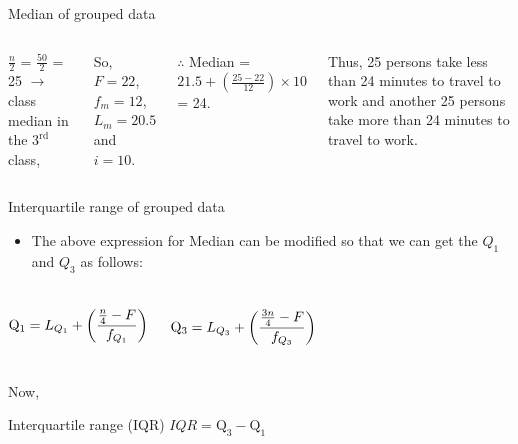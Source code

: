 \documentclass[
  ignorenonframetext,
  aspectratio=169]{beamer}
\providecommand{\tightlist}{%
  \setlength{\itemsep}{0pt}\setlength{\parskip}{0pt}}
\begin{document}
\begin{frame}{Median of grouped data}
\begin{columns}[T, onlytextwidth]
\footnotesize
$\frac{n}{2}$ = $\frac{50}{2}$ = 25 $\longrightarrow$ class median in the $3^{\text{rd}}$ class,

So, $F = 22$, $f_m = 12$, $L_m = 20.5$ and $i = 10$.

$\therefore$ Median = $21.5 + \left(\frac{25-22}{12}\right)\times 10$ = 24.

Thus, 25 persons take less than 24 minutes to travel to work and another 25 persons take more than 24 minutes to travel to work.

\end{columns}
\end{frame}

\begin{frame}{Interquartile range of grouped data}
\protect\hypertarget{interquartile-range-of-grouped-data}{}
\begin{itemize}
\tightlist
\item
  The above expression for Median can be modified so that we can get the
  \(Q_1\) and \(Q_3\) as follows:
\end{itemize}

\begin{columns}[T,onlytextwidth]

$$
\small
\mathrm{Q_1} = L_{Q_1} + \left(  \frac{\frac{n}{4} - F}{f_{Q_1}} \right)
$$

$$
\small
\mathrm{Q_3} = L_{Q_3} + \left(  \frac{\frac{3n}{4} - F}{f_{Q_3}} \right)
$$

\end{columns}

Now,

\begin{block}{Interquartile range (IQR)}
$IQR = \mathrm{Q_3} - \mathrm{Q_1}$
\end{block}
\end{frame}
\end{document}

